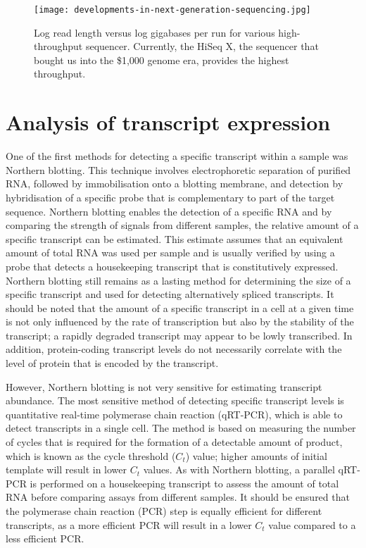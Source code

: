 \begin{figure}[!ht]
   \centering
   \texttt{[image: developments-in-next-generation-sequencing.jpg]}
   \caption[Developments in next generation sequencing]{Log read length versus log gigabases per run for various high-throughput sequencer\cite{Nederbragt2012}. Currently, the HiSeq X, the sequencer that bought us into the \$1,000 genome era, provides the highest throughput.}
   \label{fig:dev_next_gen}
\end{figure}

\section{Analysis of transcript expression}

One of the first methods for detecting a specific transcript within a sample was Northern blotting\cite{pmid414220}. This technique involves electrophoretic separation of purified RNA, followed by immobilisation onto a blotting membrane, and detection by hybridisation of a specific probe that is complementary to part of the target sequence. Northern blotting enables the detection of a specific RNA and by comparing the strength of signals from different samples, the relative amount of a specific transcript can be estimated. This estimate assumes that an equivalent amount of total RNA was used per sample and is usually verified by using a probe that detects a housekeeping transcript that is constitutively expressed. Northern blotting still remains as a lasting method for determining the size of a specific transcript and used for detecting alternatively spliced transcripts. It should be noted that the amount of a specific transcript in a cell at a given time is not only influenced by the rate of transcription but also by the stability of the transcript; a rapidly degraded transcript may appear to be lowly transcribed. In addition, protein-coding transcript levels do not necessarily correlate with the level of protein that is encoded by the transcript.

However, Northern blotting is not very sensitive for estimating transcript abundance. The most sensitive method of detecting specific transcript levels is quantitative real-time polymerase chain reaction (qRT-PCR), which is able to detect transcripts in a single cell. The method is based on measuring the number of cycles that is required for the formation of a detectable amount of product, which is known as the cycle threshold ($C_{t}$) value; higher amounts of initial template will result in lower $C_{t}$ values. As with Northern blotting, a parallel qRT-PCR is performed on a housekeeping transcript to assess the amount of total RNA before comparing assays from different samples. It should be ensured that the polymerase chain reaction (PCR) step is equally efficient for different transcripts, as a more efficient PCR will result in a lower $C_{t}$ value compared to a less efficient PCR.

